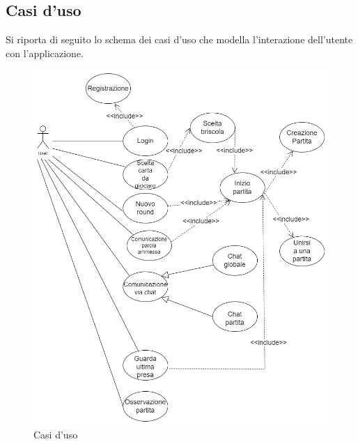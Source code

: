 \subsection{Casi d'uso}
Si riporta di seguito lo schema dei casi d'uso che modella l'interazione dell'utente con l'applicazione.
\begin{figure}[h!]
    \centering 
    \includegraphics[scale=0.45]{report/img/Casi_duso.png}
    \caption{Casi d'uso}
    \label{use_case}
\end{figure}










